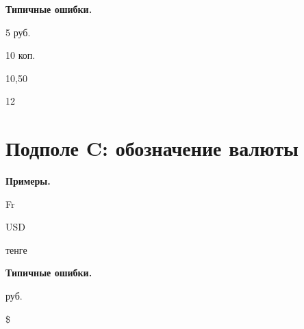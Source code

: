 \textbf{Типичные ошибки.}

\begin{cutelist}
    \item 5 руб.
    \item 10 коп.
    \item 10,50
    \item 12
\end{cutelist}

\section{Подполе C: обозначение валюты}

\textbf{Примеры.}

\begin{cutelist}
    \item Fr
    \item USD
    \item тенге
\end{cutelist}

\textbf{Типичные ошибки.}

\begin{cutelist}
    \item руб.
    \item \$
\end{cutelist}
